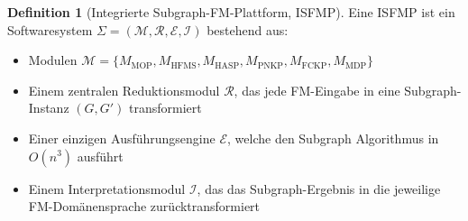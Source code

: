 ﻿\documentclass[a4paper,12pt]{article}
\theoremstyle{definition}
\newtheorem{definition}{Definition}[section]
\begin{document}
\begin{definition}[Integrierte Subgraph-FM-Plattform, ISFMP]
\label{def:isfmp}
Eine ISFMP ist ein Softwaresystem $\Sigma = (\mathcal{M}, \mathcal{R}, \mathcal{E}, \mathcal{I})$
bestehend aus:
\begin{itemize}
    \item Modulen $\mathcal{M} = \{M_{\mathrm{MOP}}, M_{\mathrm{HFMS}}, M_{\mathrm{HASP}},
          M_{\mathrm{PNKP}}, M_{\mathrm{FCKP}}, M_{\mathrm{MDP}}\}$
    \item Einem zentralen Reduktionsmodul $\mathcal{R}$, das jede FM-Eingabe in
          eine Subgraph-Instanz $(G, G')$ transformiert
    \item Einer einzigen Ausführungsengine $\mathcal{E}$, welche den
          Subgraph Algorithmus in $O(n^3)$ ausführt
    \item Einem Interpretationsmodul $\mathcal{I}$, das das Subgraph-Ergebnis
          in die jeweilige FM-Domänensprache zurücktransformiert
\end{itemize}
\end{definition}
\end{document}
